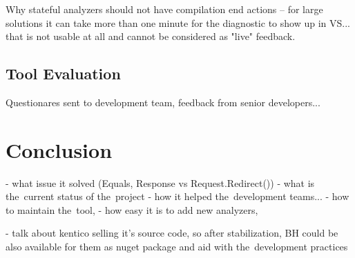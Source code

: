 \documentclass[
  digital, %
  table,   %
  lof,     %
  lot,     %
  oneside,
]{fithesis3}
\begin{document}
Why stateful analyzers should not have compilation end actions -- for large solutions it can take more than one minute for the diagnostic to show up in VS... that is not usable at all and cannot be considered as "live" feedback.

\section{Tool Evaluation}
Questionares sent to development team, feedback from senior developers...

\chapter{Conclusion}
  - what issue it solved (Equals, Response vs Request.Redirect())
  - what is the~current status of the~project
  - how it helped the~development teams...
  - how to maintain the~tool, 
  - how easy it is to add new analyzers, 

- talk about kentico selling it's source code, so after stabilization, BH could be also available for them as nuget package and aid with the~development practices 
%
%
%
%
%
%
\end{document}
